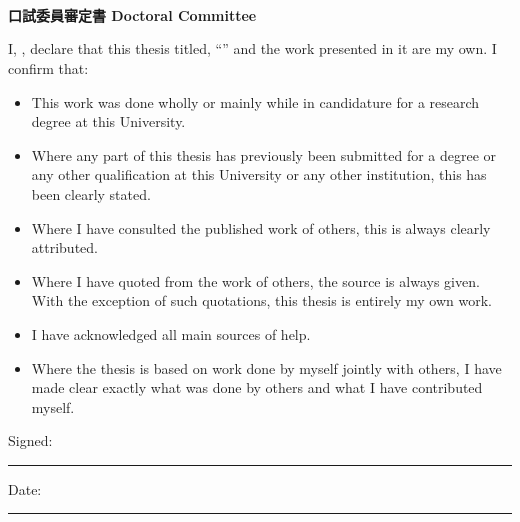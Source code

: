 \documentclass[
11pt, %
english, %
singlespacing, %
nolistspacing, %
liststotoc, %
toctotoc, %
parskip, %
headsepline, %
consistentlayout, %
]{MastersDoctoralThesis} %
\begin{document}

\begin{CJK}{UTF8}{bkai}
 ~ \\
 ~ \\
 ~ \\
\Large \textbf{口試委員審定書 Doctoral Committee}
\end{CJK}

\cleardoublepage
\cleardoublepage



\begin{declaration}
\addchaptertocentry{\authorshipname} %

\noindent I, \authorname, declare that this thesis titled, \enquote{\ttitle} and the work presented in it are my own. I confirm that:

\begin{itemize} 
\item This work was done wholly or mainly while in candidature for a research degree at this University.
\item Where any part of this thesis has previously been submitted for a degree or any other qualification at this University or any other institution, this has been clearly stated.
\item Where I have consulted the published work of others, this is always clearly attributed.
\item Where I have quoted from the work of others, the source is always given. With the exception of such quotations, this thesis is entirely my own work.
\item I have acknowledged all main sources of help.
\item Where the thesis is based on work done by myself jointly with others, I have made clear exactly what was done by others and what I have contributed myself.
\end{itemize}

\vfill 
 
\noindent Signed:\\
\rule[0.5em]{25em}{0.5pt} %
 
\noindent Date:\\
\rule[0.5em]{25em}{0.5pt} %
\end{declaration}
\end{document}
